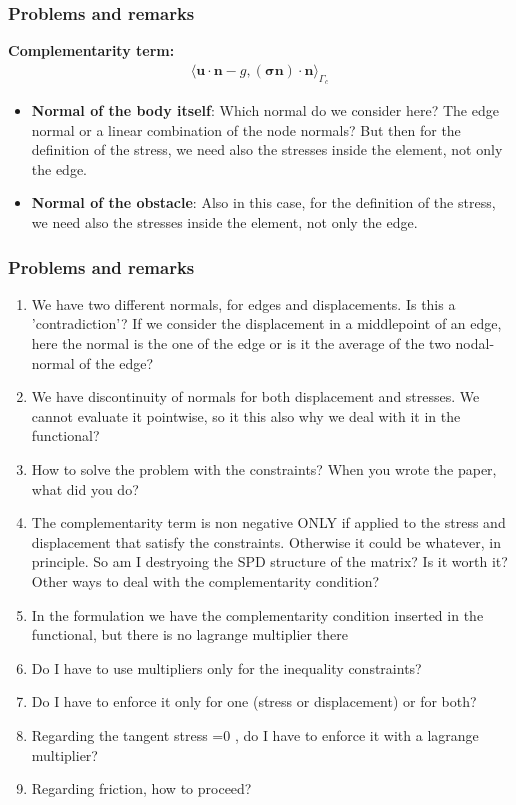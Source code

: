 \documentclass[8pt, oneside]{beamer}   	%
\newcommand{\bn}{\textbf{n}}
\newcommand{\bu}{\textbf{u}}
\newcommand{\bsigma}{\boldsymbol{\sigma}}
\begin{document}
\begin{frame}
\frametitle{\textbf{Problems and remarks}}
\textbf{Complementarity term:
}\begin{align*}
\langle \bu \cdot \bn -g, (\bsigma \bn) \cdot \bn \rangle_{\Gamma_c}
\end{align*}
\begin{itemize}
\item \textbf{Normal of the body itself}: Which normal do we consider here? The edge normal or a linear combination of the node normals? But then for the definition of the stress, we need also the stresses inside the element, not only the edge.
\item \textbf{Normal of the obstacle}: Also in this case, for the definition of the stress, we need also the stresses inside the element, not only the edge.
\end{itemize}
\end{frame}


\begin{frame}
\frametitle{\textbf{Problems and remarks}}
\begin{enumerate}
\item We have two different normals, for edges and displacements. Is this a 'contradiction'? If we consider the displacement in a middlepoint of an edge, here the normal is the one of the edge or is it the average of the two nodal-normal of the edge?
\item 
We have discontinuity of normals for both displacement and stresses. We cannot evaluate it pointwise, so it this also why we deal with it in the functional? 
\item How to solve the problem with the constraints? When you wrote the paper, what did you do?\\
\item The complementarity term is non negative ONLY if applied to the stress and displacement that satisfy the constraints. Otherwise it could be whatever, in principle. So am I destryoing the SPD structure of the matrix? Is it worth it? Other ways to deal with the complementarity condition?
\item  In the formulation we have the complementarity condition inserted in the functional, but there is no lagrange multiplier there
\item  Do I have to use multipliers only for the inequality constraints?
\item  Do I have to enforce it only for one (stress or displacement) or for both?
\item  Regarding the tangent stress =0 , do I have to enforce it with a lagrange multiplier?
\item  Regarding friction, how to proceed?
\end{enumerate}
\end{frame}
\end{document}
